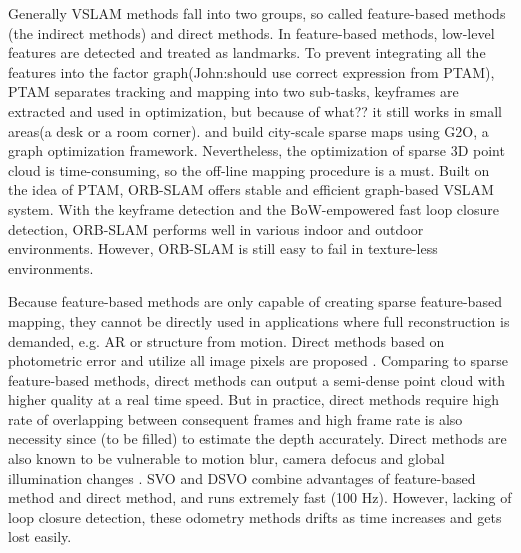 \documentclass[journal]{IEEEtran}
\begin{document}

Generally VSLAM methods fall into two groups, so called feature-based methods (the indirect methods) and direct methods. 
In feature-based methods, low-level features are detected and treated as landmarks. 
To prevent integrating all the features into the factor graph(John:should use correct expression from PTAM), PTAM\cite{Klein2007Parallel} separates tracking and mapping into two sub-tasks, keyframes are extracted and used in optimization, but because of what?? it still works in small areas(a desk or a room corner). 
\cite{Lategahn2012City} and \cite{Lategahn2014Vision} build city-scale sparse maps using G2O, a graph optimization framework\citep{K2011G2o}. 
Nevertheless, the optimization of sparse 3D point cloud is time-consuming, so the off-line mapping procedure is a must. Built on the idea of PTAM\cite{Klein2007Parallel}, ORB-SLAM \cite{Mur2017ORB} offers stable and efficient graph-based VSLAM system.
With the keyframe detection and the BoW-empowered fast loop closure detection, ORB-SLAM performs well in various indoor and outdoor environments. 
However, ORB-SLAM is still easy to fail in texture-less environments.

%

Because feature-based methods are only capable of creating sparse feature-based mapping, they cannot be directly used in applications where full reconstruction is demanded, e.g. AR or structure from motion.
Direct methods based on photometric error and utilize all image pixels are proposed \citep{Engel2014LSD}.
Comparing to sparse feature-based methods, direct methods can output a semi-dense point cloud with higher quality at a real time speed. 
But in practice, direct methods require high rate of overlapping between consequent frames and high frame rate is also necessity since (to be filled) to estimate the depth accurately.
Direct methods are also known to be vulnerable to motion blur, camera defocus and global illumination changes \cite{Newcombe2011DTAM}. 
SVO \cite{Forster2013SVO} and DSVO\cite{} combine advantages of feature-based method and direct method, and runs extremely fast (100 Hz). 
However, lacking of loop closure detection, these odometry methods drifts as time increases and gets lost easily.
	
\end{document}
